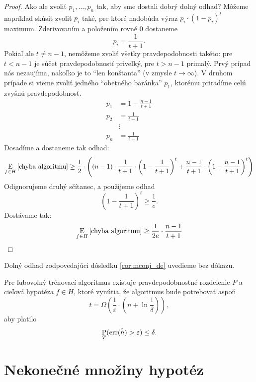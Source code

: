 \begin{proof}
  Ako ale zvoliť $p_1, \ldots, p_n$ tak, aby sme dostali dobrý dolný
  odhad? Môžeme napríklad skúsiť zvoliť $p_i$ také, pre ktoré nadobúda
  výraz $p_i \cdot (1 - p_i)^t$ maximum. Zderivovaním a položením rovné
  $0$ dostaneme
  $$p_i = \frac{1}{t+1}.$$
  Pokiaľ ale $t \neq n - 1$, nemôžeme zvoliť všetky pravdepodobnosti
  takéto: pre $t < n - 1$ je súčet pravdepodobností priveľký, pre $t > n - 1$
  primalý. Prvý prípad nás nezaujíma, nakoľko je to ``len konštanta''
  (v zmysle $t \to \infty$). V druhom prípade si vieme zvoliť jedného
  ``obetného baránka'' $p_1$, ktorému priradíme celú zvyšnú
  pravdepodobnosť.
  \begin{align}
    p_1 &= 1 - \frac{n-1}{t+1} \\
    p_2 &= \frac{1}{t+1} \\
        &\vdots \\
    p_n &= \frac{1}{t+1}
  \end{align}
  Dosadíme a dostaneme tak odhad:
  $$ \operatorname*{\mathrm{E}}_{f \in H} \left[ \text{\normalfont chyba algoritmu} \right] \geq \frac{1}{2} \cdot \left( (n - 1) \cdot \frac{1}{t+1} \cdot \left( 1 - \frac{1}{t+1} \right)^t + \frac{n-1}{t+1} \cdot \left( 1 - \frac{n-1}{t+1} \right)^t   \right) $$
  Odignorujeme druhý sčítanec, a použijeme odhad
  $$ \left( 1 - \frac{1}{t+1} \right)^t \geq \frac{1}{e}. $$
  Dostávame tak:
  $$ \operatorname*{\mathrm{E}}_{f \in H} \left[ \text{\normalfont chyba algoritmu} \right] \geq \frac{1}{2e} \cdot \frac{n-1}{t+1} $$
\end{proof}

Dolný odhad zodpovedajúci dôsledku \ref{cor:mconj_de} uvedieme bez dôkazu.

\begin{theorem}
  Pre ľubovoľný trénovací algoritmus existuje pravdepodobnostné rozdelenie
  $P$ a cieľová hypotéza $f \in H$, ktoré vynútia, že algoritmus bude
  potrebovať aspoň
  $$ t = \Omega \left( \frac{1}{\varepsilon} \cdot \left( n + \ln{\frac{1}{\delta}} \right) \right), $$
  aby platilo
  $$ \operatorname*{\mathrm{P}}_T(\mathrm{err}(\hat{h}) > \varepsilon) \leq \delta.$$
\end{theorem}





\section{Nekonečné množiny hypotéz}
